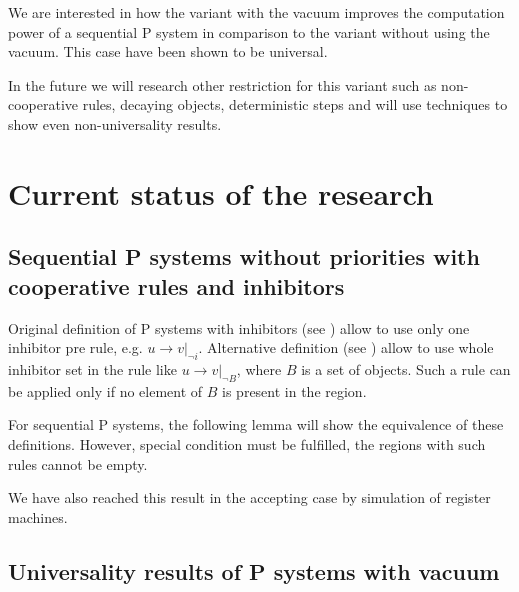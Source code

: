 We are interested in how the variant with the vacuum improves the computation power of a sequential P system in comparison to the variant without using the vacuum. This case have been shown to be universal.

In the future we will research other restriction for this variant such as non-cooperative rules, decaying objects, deterministic steps and will use techniques to show even non-universality results.



\chapter{Current status of the research} %
\label{cha:current_status_of_the_research}

\section{Sequential P systems without priorities with cooperative rules and inhibitors} %
\label{sec:sequential_p_systems_without_priorities_with_cooperative_rules_and_inhibitors}

Original definition of P systems with inhibitors (see \cite{Ionescu:jucs_10_5:on_p_systems_with}) allow to use only one inhibitor pre rule, e.g. $u\rightarrow v|_{\neg i}$. Alternative definition (see \cite{Agrigoroaiei:2010:Dissolution}) allow to use whole inhibitor set in the rule like $u\rightarrow v|_{\neg B}$, where $B$ is a set of objects. Such a rule can be applied only if no element of $B$ is present in the region.

For sequential P systems, the following lemma will show the equivalence of these definitions. However, special condition must be fulfilled, the regions with such rules cannot be empty.



We have also reached this result in the accepting case by simulation of register machines.




\section{Universality results of P systems with vacuum} %
\label{sec:universality_results_of_p_systems_with_vacuum}





